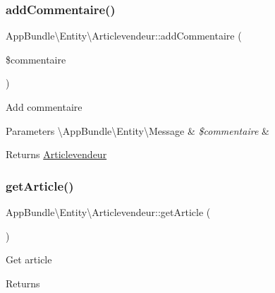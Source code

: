 \subsubsection{\texorpdfstring{add\+Commentaire()}{addCommentaire()}}
{\footnotesize\ttfamily App\+Bundle\textbackslash{}\+Entity\textbackslash{}\+Articlevendeur\+::add\+Commentaire (\begin{DoxyParamCaption}\item[{\textbackslash{}\hyperlink{class_app_bundle_1_1_entity_1_1_message}{App\+Bundle\textbackslash{}\+Entity\textbackslash{}\+Message}}]{\$commentaire }\end{DoxyParamCaption})}

Add commentaire


\begin{DoxyParams}[1]{Parameters}
\textbackslash{}\+App\+Bundle\textbackslash{}\+Entity\textbackslash{}\+Message & {\em \$commentaire} & \\
\hline
\end{DoxyParams}
\begin{DoxyReturn}{Returns}
\hyperlink{class_app_bundle_1_1_entity_1_1_articlevendeur}{Articlevendeur} 
\end{DoxyReturn}
\mbox{\label{class_app_bundle_1_1_entity_1_1_articlevendeur_abd7f6ecdd969255698a8dfc8d978941c}} 
\subsubsection{\texorpdfstring{get\+Article()}{getArticle()}}
{\footnotesize\ttfamily App\+Bundle\textbackslash{}\+Entity\textbackslash{}\+Articlevendeur\+::get\+Article (\begin{DoxyParamCaption}{ }\end{DoxyParamCaption})}

Get article

\begin{DoxyReturn}{Returns}

\end{DoxyReturn}
\mbox{\label{class_app_bundle_1_1_entity_1_1_articlevendeur_ac8a6ebc92d6179d9d951692b63c3fb40}} 
